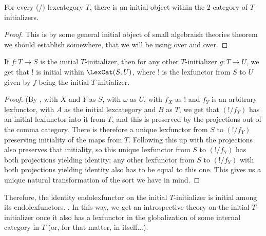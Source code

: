 \begin{theorem}
For every (\setsmall/) lexcategory $T$, there is an initial object within the 2-category of $T$-initializers.
\end{theorem}
\begin{proof}
This is by some general initial object of small algebraish theories theorem  we should establish somewhere, that we will be using over and over. \TODO
\end{proof}

\begin{theorem}
If $f : T \to S$ is the initial $T$-initializer, then for any other $T$-initializer $g : T \to U$, we get that $!$ is initial within $\LexCat(S, U)$, where $!$ is the lexfunctor from $S$ to $U$ given by $f$ being the initial $T$-initializer.
\end{theorem}
\begin{proof}
\TODO (By , with $X$ and $Y$ as $S$, with $\omega$ as $U$, with $f_X$ as $!$ and $f_Y$ is an arbitrary lexfunctor, with $A$ as the initial lexcategory and $B$ as $T$, we get that $(!/f_Y)$ has an initial lexfunctor into it from $T$, and this is preserved by the projections out of the comma category. There is therefore a unique lexfunctor from $S$ to $(!/f_Y)$ preserving initiality of the maps from $T$. Following this up with the projections also preserves that initiality, so this unique lexfunctor from $S$ to $(!/f_Y)$ has both projections yielding identity; any other lexfunctor from $S$ to $(!/f_Y)$ with both projections yielding identity also has to be equal to this one. This gives us a unique natural transformation of the sort we have in mind. 
\end{proof}

Therefore, the identity endolexfunctor on the initial $T$-initializer is initial among its endolexfunctors. . In this way, we get an introspective theory on the initial $T$-initializer once it also has a lexfunctor in the globalization of some internal category in $T$ (or, for that matter, in itself...).


